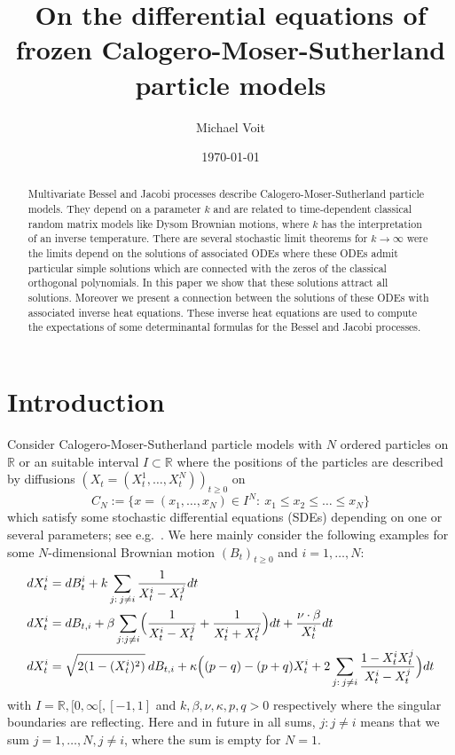 \documentclass[reqno]{amsart}
\title[The differential equations of frozen CMS  models]{On the differential equations of frozen Calogero-Moser-Sutherland particle models}
\author{Michael Voit}
\theoremstyle{plain}
\theoremstyle{definition}
\numberwithin{equation}{section}
\begin{document}

\begin{abstract}
Multivariate Bessel and Jacobi processes   describe Calogero-Moser-Sutherland  particle models. 
They depend on a parameter $k$ and are related to time-dependent classical random matrix models like Dysom Brownian motions,
where $k$ has the interpretation of an inverse temperature.
There are several stochastic limit theorems for $k\to\infty$ were the limits depend on the solutions 
of  associated ODEs where these ODEs admit particular simple solutions which are connected with the zeros of the classical orthogonal polynomials.
In this paper we show that these solutions attract all solutions. Moreover we present a connection between
the solutions of these ODEs with associated inverse heat equations. These inverse heat equations are used to compute the
expectations  of some determinantal formulas for the  Bessel and Jacobi processes.
\end{abstract}


\date{\today}

\maketitle


\section{Introduction}

Consider Calogero-Moser-Sutherland particle models with $N$ ordered
particles on $\mathbb R$ or an suitable interval $I\subset\mathbb R$
where the positions of the particles are described by diffusions $(X_t=(X_t^1,\ldots,X_t^N))_{t\ge0}$ on
$$C_N:=\{x=(x_1,\ldots,x_N)\in I^N: \> x_1\le x_2\le\ldots \le x_N\}$$
which satisfy some stochastic differential equations (SDEs) depending on one or several parameters;
see e.g.~\cite{BF, DV, F, Ka, LV}.
We here mainly consider the following examples
 for some $N$-dimensional Brownian motion $(B_t)_{t\ge0}$ and $i=1,\ldots,N$:
\begin{align}\label{SDE-intro}
dX_{t}^i &= d B_t^i+ k\sum_{j: \> j\ne i} \frac{1}{X_{t}^i-X_{t}^j}dt \\
dX_{t}^i &= d B_{t,i}+ \beta \sum_{j: j\ne i}
\Bigl(\frac{1}{X_{t}^i-X_{t}^j}+
\frac{1}{X_{t}^i+X_{t}^j}\Bigr)dt
+ \frac{\nu\cdot\beta}{X_{t}^i}dt\notag\\
  dX_{t}^i & =\sqrt{2(1-(X_{t}^i)^2)}\> d B_{t,i} +
\kappa\Bigl((p-q) -(p+q)X_{t}^i +
2\sum_{j: \> j\ne i}\frac{1-X_{t}^iX_{t}^j}{X_{t}^i-X_{t}^j}\Bigr)dt
\notag\end{align}
with $I=\mathbb R, [0,\infty[, [-1,1]$ and $k,\beta,\nu, \kappa,p,q>0$ respectively where the singular boundaries are reflecting.
  Here and in future in all sums, $j:j\ne i$ means that we sum $j=1,\ldots,N, j\ne i$, where the sum is empty for $N=1$.
\end{document}
